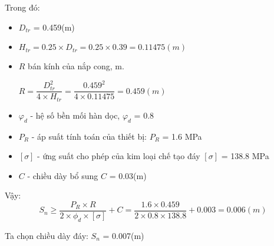 \pagebreak
Trong đó:
\begin{itemize}
	\item $D_{tr}$ = 0.459(m)
	\item $H_{tr} = 0.25\times D_{tr} = 0.25 \times 0.39 = 0.11475(m)$
	\item $R$ bán kính của nắp cong, m.
	
	$R = \dfrac{D_{tr}^2}{4\times H_{tr}} = \dfrac{0.459^2}{4 \times 0.11475} = 0.459(m) $
	\item $ \varphi_{d} $ - hệ số bền mối hàn dọc, $\varphi_{d}$ = 0.8
	\item $P_{R}$ - áp suất tính toán của thiết bị: $P_{R}$ = 1.6 MPa
	\item $[\sigma]$ - ứng suất cho phép của kim loại chế tạo đáy $[\sigma]$ = 138.8 MPa 
	\item $C$ - chiều dày bổ sung $C$ = 0.03(m)
\end{itemize}

Vậy: 
\begin{equation*}
	S_{n} \geq \dfrac{P_{R}\times R}{2\times \phi_{d}\times[\sigma]} + C = \dfrac{1.6 \times 0.459}{2 \times 0.8 \times 138.8}+0.003 = 0.006(m)
\end{equation*}

Ta chọn chiều dày đáy: $S_{n}$ = 0.007(m)